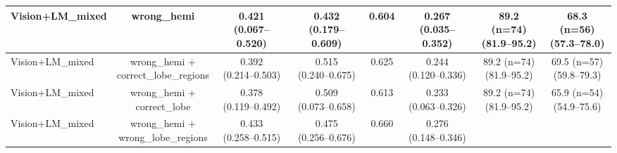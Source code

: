 \documentclass[FCD_GNN.tex]{subfiles}
\begin{document}
\begin{table}[H]
\begin{tabular}{lccccccc}
    \hline
    Vision+LM\_mixed &
    wrong\_hemi &
    \makecell{\colorbox{cyan!15}{0.421} \\ (0.067--0.520)} &
    \makecell{0.432 \\ (0.179--0.609)} &
    0.604 &
    \makecell{\colorbox{cyan!15}{0.267} \\ (0.035--0.352)} &
    \makecell{89.2 (n=74) \\ (81.9--95.2)} &
    \makecell{\colorbox{orange!15}{68.3 (n=56)} \\ (57.3--78.0)} \\
    \hline
    Vision+LM\_mixed &
    \makecell{wrong\_hemi + \\ correct\_lobe\_regions} &
    \makecell{0.392 \\ (0.214--0.503)} &
    \makecell{\colorbox{green!15}{0.515} \\ (0.240--0.675)} &
    \colorbox{cyan!15}{0.625} &
    \makecell{0.244 \\ (0.120--0.336)} &
    \makecell{89.2 (n=74) \\ (81.9--95.2)} &
    \makecell{\colorbox{cyan!15}{69.5 (n=57)} \\ (59.8--79.3)} \\
    \hline
    Vision+LM\_mixed &
    \makecell{wrong\_hemi + \\ correct\_lobe} &
    \makecell{0.378 \\ (0.119--0.492)} &
    \makecell{\colorbox{cyan!15}{0.509} \\ (0.073--0.658)} &
    0.613 &
    \makecell{0.233 \\ (0.063--0.326)} &
    \makecell{89.2 (n=74) \\ (81.9--95.2)} &
    \makecell{65.9 (n=54) \\ (54.9--75.6)} \\
    \hline
    Vision+LM\_mixed &
    \makecell{wrong\_hemi + \\ wrong\_lobe\_regions} &
    \makecell{\colorbox{green!15}{0.433} \\ (0.258--0.515)} &
    \makecell{0.475 \\ (0.256--0.676)} &
    \colorbox{green!15}{0.660} &
    \makecell{\colorbox{green!15}{0.276} \\ (0.148--0.346)} &

\end{tabular}
\end{table}
\end{document}
